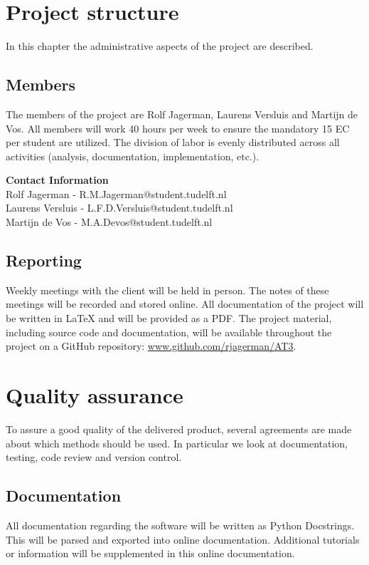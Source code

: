 \documentclass{article}
\begin{document}
\section{Project structure}

In this chapter the administrative aspects of the project are described.

\subsection{Members}
The members of the project are Rolf Jagerman, Laurens Versluis and Martijn de Vos. All members will work 40 hours per week to ensure the mandatory 15 EC per student are utilized. The division of labor is evenly distributed across all activities (analysis, documentation, implementation, etc.).

\noindent \textbf{Contact Information}\\
Rolf Jagerman - R.M.Jagerman@student.tudelft.nl\\
Laurens Versluis - L.F.D.Versluis@student.tudelft.nl\\
Martijn de Vos - M.A.Devos@student.tudelft.nl

\subsection{Reporting}
Weekly meetings with the client will be held in person. The notes of these meetings will be recorded and stored online. All documentation of the project will be written in {\LaTeX} and will be provided as a PDF. The project material, including source code and documentation, will be available throughout the project on a GitHub repository: \href{http://www.github.com/rjagerman/AT3/}{www.github.com/rjagerman/AT3}.

\section{Quality assurance}

To assure a good quality of the delivered product, several agreements are made about which methods should be used. In particular we look at documentation, testing, code review and version control.

\subsection{Documentation}
All documentation regarding the software will be written as Python Docstrings. This will be parsed and exported into online documentation. Additional tutorials or information will be supplemented in this online documentation.
\end{document}
